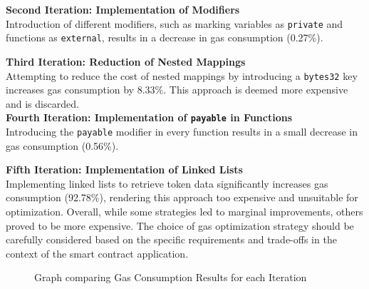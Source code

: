 \documentclass[fleqn,10pt]{olplainarticle}
\begin{document}
\textbf{Second Iteration: Implementation of Modifiers} \\
Introduction of different modifiers, such as marking variables as \texttt{private} and functions as \texttt{external}, results in a decrease in gas consumption (0.27\%).

\textbf{Third Iteration: Reduction of Nested Mappings} \\
Attempting to reduce the cost of nested mappings by introducing a \texttt{bytes32} key increases gas consumption by 8.33\%. This approach is deemed more expensive and is discarded. \\
\textbf{Fourth Iteration: Implementation of \texttt{payable} in Functions} \\
Introducing the \texttt{payable} modifier in every function results in a small decrease in gas consumption (0.56\%).

\textbf{Fifth Iteration: Implementation of Linked Lists}\\
Implementing linked lists to retrieve token data significantly increases gas consumption (92.78\%), rendering this approach too expensive and unsuitable for optimization.
Overall, while some strategies led to marginal improvements, others proved to be more expensive. The choice of gas optimization strategy should be carefully considered based on the specific requirements and trade-offs in the context of the smart contract application.

\begin{figure}[h]
	\centering
	\caption{Graph comparing Gas Consumption Results for each Iteration}
	\label{tab:Graph}
\end{figure}



\newpage

\end{document}
